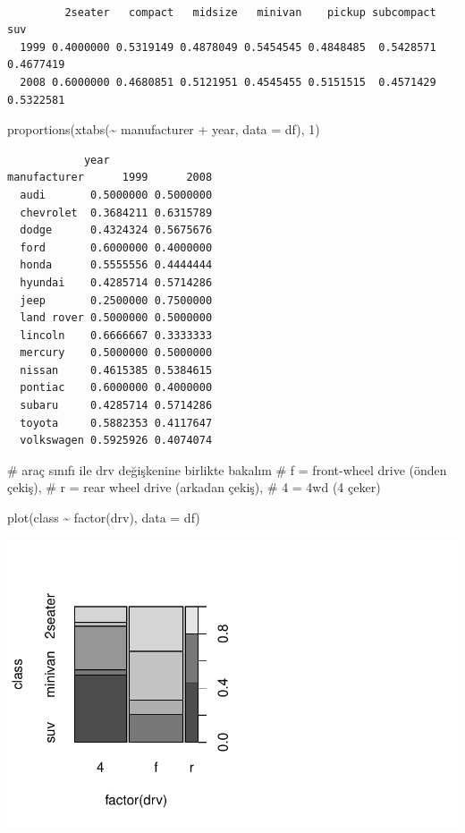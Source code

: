 \documentclass[
  letterpaper,
  DIV=11,
  numbers=noendperiod]{scrreprt}
\newenvironment{Shaded}{\begin{snugshade}}{\end{snugshade}}
\newcommand{\AttributeTok}[1]{\textcolor[rgb]{0.40,0.45,0.13}{#1}}
\newcommand{\CommentTok}[1]{\textcolor[rgb]{0.37,0.37,0.37}{#1}}
\newcommand{\DecValTok}[1]{\textcolor[rgb]{0.68,0.00,0.00}{#1}}
\newcommand{\FunctionTok}[1]{\textcolor[rgb]{0.28,0.35,0.67}{#1}}
\newcommand{\NormalTok}[1]{\textcolor[rgb]{0.00,0.23,0.31}{#1}}
\newcommand{\SpecialCharTok}[1]{\textcolor[rgb]{0.37,0.37,0.37}{#1}}
\begin{document}
\begin{verbatim}
      
         2seater   compact   midsize   minivan    pickup subcompact       suv
  1999 0.4000000 0.5319149 0.4878049 0.5454545 0.4848485  0.5428571 0.4677419
  2008 0.6000000 0.4680851 0.5121951 0.4545455 0.5151515  0.4571429 0.5322581
\end{verbatim}

\begin{Shaded}
\begin{Highlighting}[]
\FunctionTok{proportions}\NormalTok{(}\FunctionTok{xtabs}\NormalTok{(}\SpecialCharTok{\textasciitilde{}}\NormalTok{ manufacturer }\SpecialCharTok{+}\NormalTok{ year, }\AttributeTok{data =}\NormalTok{ df), }\DecValTok{1}\NormalTok{)}
\end{Highlighting}
\end{Shaded}

\begin{verbatim}
            year
manufacturer      1999      2008
  audi       0.5000000 0.5000000
  chevrolet  0.3684211 0.6315789
  dodge      0.4324324 0.5675676
  ford       0.6000000 0.4000000
  honda      0.5555556 0.4444444
  hyundai    0.4285714 0.5714286
  jeep       0.2500000 0.7500000
  land rover 0.5000000 0.5000000
  lincoln    0.6666667 0.3333333
  mercury    0.5000000 0.5000000
  nissan     0.4615385 0.5384615
  pontiac    0.6000000 0.4000000
  subaru     0.4285714 0.5714286
  toyota     0.5882353 0.4117647
  volkswagen 0.5925926 0.4074074
\end{verbatim}

\begin{Shaded}
\begin{Highlighting}[]
\CommentTok{\# araç sınıfı ile drv değişkenine birlikte bakalım}
\CommentTok{\# f = front{-}wheel drive (önden çekiş), }
\CommentTok{\# r = rear wheel drive (arkadan çekiş), }
\CommentTok{\# 4 = 4wd (4 çeker)}

\FunctionTok{plot}\NormalTok{(class }\SpecialCharTok{\textasciitilde{}} \FunctionTok{factor}\NormalTok{(drv), }\AttributeTok{data =}\NormalTok{ df)}
\end{Highlighting}
\end{Shaded}

\includegraphics{data_analysis_files/figure-pdf/unnamed-chunk-3-4.pdf}
\end{document}
